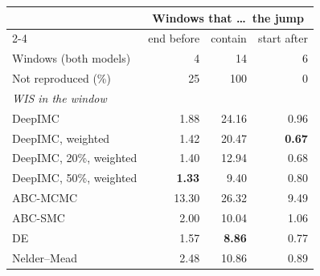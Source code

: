 \begin{tabular}{lrrr}
\toprule
 & \multicolumn{3}{c}{Windows that \ldots\ the jump} \\
\cmidrule(lr){2-4}
 & end before & contain & start after \\
\midrule
Windows (both models) & 4 & 14 & 6 \\
Not reproduced (\%) & 25 & 100 & 0 \\
\midrule
\multicolumn{4}{l}{\textit{WIS in the window}} \\
DeepIMC & 1.88 & 24.16 & 0.96 \\
DeepIMC, weighted & 1.42 & 20.47 & \textbf{0.67} \\
DeepIMC, 20\%, weighted & 1.40 & 12.94 & 0.68 \\
DeepIMC, 50\%, weighted & \textbf{1.33} & 9.40 & 0.80 \\
ABC-MCMC & 13.30 & 26.32 & 9.49 \\
ABC-SMC & 2.00 & 10.04 & 1.06 \\
DE & 1.57 & \textbf{8.86} & 0.77 \\
Nelder--Mead & 2.48 & 10.86 & 0.89 \\
\bottomrule
\end{tabular}
